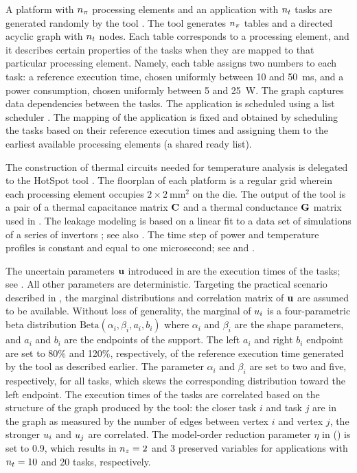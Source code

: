A platform with ${n_\pi}$ processing elements and an application with ${n_t}$ tasks
are generated randomly by the  tool \cite{dick1998}. The tool generates
${n_\pi}$ tables and a directed acyclic graph with ${n_t}$ nodes. Each table
corresponds to a processing element, and it describes certain properties of the
tasks when they are mapped to that particular processing element. Namely, each
table assigns two numbers to each task: a reference execution time, chosen
uniformly between 10 and 50~ms, and a power consumption, chosen uniformly
between 5 and 25~W. The graph captures data dependencies between the tasks. The
application is scheduled using a list scheduler \cite{adam1974}. The mapping of
the application is fixed and obtained by scheduling the tasks based on their
reference execution times and assigning them to the earliest available
processing elements (a shared ready list).

The construction of thermal  circuits needed for temperature analysis is
delegated to the HotSpot tool \cite{skadron2004}. The floorplan of each platform
is a regular grid wherein each processing element occupies $2 \times
2~\text{mm}^2$ on the die. The output of the tool is a pair of a thermal
capacitance matrix $\mathbf{C}$ and a thermal conductance $\mathbf{G}$ matrix used in
. The leakage modeling is based on a linear fit to a data
set of  simulations of a series of  invertors
\cite{ukhov2012, liu2007}; see also \cite{ukhov2014}. The time step of power and
temperature profiles is constant and equal to one microsecond; see 
and .

The uncertain parameters $\mathbf{u}$ introduced in  are the execution
times of the tasks; see . All other parameters are deterministic.
Targeting the practical scenario described in , the marginal
distributions and correlation matrix of $\mathbf{u}$ are assumed to be available.
Without loss of generality, the marginal of $u_i$ is a four-parametric beta
distribution $\text{Beta}(\alpha_i, \beta_i, a_i, b_i)$ where $\alpha_i$ and
$\beta_i$ are the shape parameters, and $a_i$ and $b_i$ are the endpoints of the
support. The left $a_i$ and right $b_i$ endpoint are set to 80\% and 120\%,
respectively, of the reference execution time generated by the  tool as
described earlier. The parameter $\alpha_i$ and $\beta_i$ are set to two and
five, respectively, for all tasks, which skews the corresponding distribution
toward the left endpoint. The execution times of the tasks are correlated based
on the structure of the graph produced by the  tool: the closer task
$i$ and task $j$ are in the graph as measured by the number of edges between
vertex $i$ and vertex $j$, the stronger $u_i$ and $u_j$ are correlated. The
model-order reduction parameter $\eta$ in  ()
is set to 0.9, which results in ${n_z} = 2$ and 3 preserved variables for
applications with ${n_t} = 10$ and 20 tasks, respectively.

